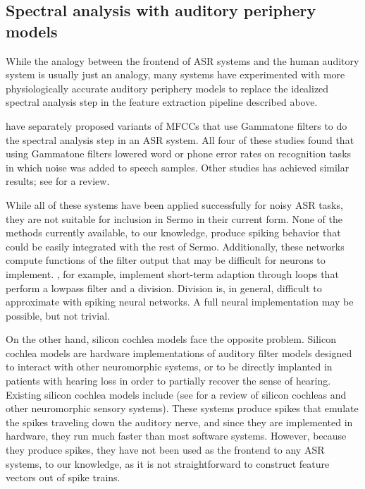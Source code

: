\subsection{Spectral analysis with auditory periphery models}

While the analogy
between the frontend of ASR systems
and the human auditory system
is usually just an analogy,
many systems have experimented with
more physiologically accurate
auditory periphery models
to replace the idealized spectral analysis step
in the feature extraction pipeline described above.

\citet{tchorz1999,dimitriadis2005,schluter2007,shao2009}
have separately proposed variants of MFCCs
that use Gammatone filters
to do the spectral analysis step in an ASR system.
All four of these studies
found that using Gammatone filters
lowered word or phone error rates
on recognition tasks in which
noise was added to speech samples.
Other studies has achieved similar results;
see \citet{stern2012} for a review.

While all of these systems
have been applied successfully
for noisy ASR tasks,
they are not suitable
for inclusion in Sermo in their current form.
None of the methods currently available,
to our knowledge, produce spiking behavior
that could
be easily integrated with the rest of Sermo.
Additionally, these networks compute
functions of the filter output that
may be difficult for neurons to implement.
\citet{tchorz1999}, for example,
implement short-term adaption
through loops that perform
a lowpass filter and a division.
Division is, in general,
difficult to approximate with spiking neural networks.
A full neural implementation
may be possible,
but not trivial.

On the other hand,
silicon cochlea models face the opposite problem.
Silicon cochlea models are hardware implementations
of auditory filter models
designed to interact with other neuromorphic systems,
or to be directly implanted in
patients with hearing loss
in order to partially recover the sense of hearing.
Existing silicon cochlea models include
\citet{chan2007,hamilton2008,wen2009,karuppuswamy2013}
(see \citealt{liu2010} for a review of
silicon cochleas
and other neuromorphic sensory systems).
These systems produce spikes
that emulate the spikes
traveling down the auditory nerve,
and since they are implemented in hardware,
they run much faster than most software systems.
However, because they produce spikes,
they have not been used
as the frontend to any ASR systems,
to our knowledge,
as it is not straightforward to
construct feature vectors
out of spike trains.

